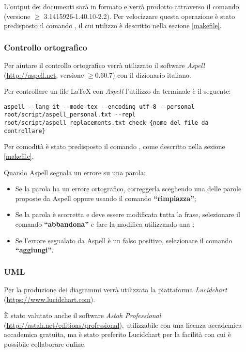 		L'output dei documenti sarà in formato  e verrà prodotto attraverso il comando  (versione $\geq$ 3.1415926-1.40.10-2.2). Per velocizzare questa operazione è stato predisposto il comando , il cui utilizzo è descritto nella sezione \ref{makefile}.
		
		\subsubsection{Controllo ortografico}
		
		Per aiutare il controllo ortografico verrà utilizzato il software \emph{Aspell} (\url{http://aspell.net}, versione $\geq 0.60.7$) con il dizionario italiano.
		
		Per controllare un file \LaTeX{} con \emph{Aspell} l'utilizzo da terminale è il seguente:
\begin{lstlisting}
aspell --lang it --mode tex --encoding utf-8 --personal root/script/aspell_personal.txt --repl root/script/aspell_replacements.txt check {nome del file da controllare}
\end{lstlisting}
		
		Per comodità è stato predisposto il comando , come descritto nella sezione \ref{makefile}.
		
		Quando Aspell segnala un errore su una parola:
		\begin{itemize}
		 \item Se la parola ha un errore ortografico, correggerla scegliendo una delle parole proposte da Aspell oppure usando il comando \textbf{``rimpiazza''};
		 \item Se la parola è scorretta e deve essere modificata tutta la frase, selezionare il comando \textbf{``abbandona''} e fare la modifica utilizzando una ;
		 \item Se l'errore segnalato da Aspell è un falso positivo, selezionare il comando \textbf{``aggiungi''}.
		\end{itemize}

		
		\subsubsection{UML}
		
		Per la produzione dei diagrammi \emph{} verrà utilizzata la piattaforma \emph{Lucidchart} (\url{https://www.lucidchart.com}).
		
		È stato valutato anche il software \emph{Astah Professional} (\url{http://astah.net/editions/professional}), utilizzabile con una licenza accademica accademica gratuita, ma è stato preferito Lucidchart per la facilità con cui è possibile collaborare online.
		
